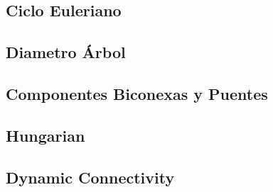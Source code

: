 \subsection{Ciclo Euleriano}

\subsection{Diametro \'Arbol}

\subsection{Componentes Biconexas y Puentes}

\subsection{Hungarian}

\subsection{Dynamic Connectivity}
